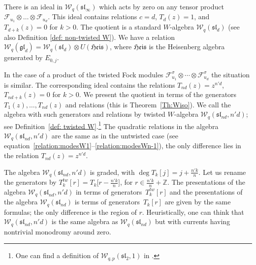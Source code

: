 \documentclass[pdftex]{sigma}
\numberwithin{equation}{section}
\theoremstyle{definition}
\newcommand{\UH}{\otimes U(\mathfrak{Heis})}
\begin{document}
There is an ideal in $\mathcal{W}_q(\mathfrak{sl}_{\infty})$ which acts by zero on any tensor product $\mathcal{F}_{u_1}\otimes \dots\otimes \mathcal{F}_{u_d}$. This ideal contains relations $c=d$, $T_d(z)=1$, and $T_{d+k}(z)=0$ for $k>0$. The quotient is a standard $W$-algebra $\mathcal{W}_q(\mathfrak{sl}_d)$ \cite{FF} (see also Definition \ref{def: non-twisted W}). We have a relation $\mathcal{W}_q(\mathfrak{gl}_d)=\mathcal{W}_q(\mathfrak{sl}_d) \UH$, where $\mathfrak{Heis}$ is the Heisenberg algebra generated by $E_{0,j}$.

In the case of a product of the twisted Fock modules ${\mathcal{F}^{\sigma}_{u_1} \otimes \cdots \otimes \mathcal{F}_{u_d}^{\sigma}}$ the situation is similar. The corresponding ideal contains the relations $T_{nd}(z)=z^{n'd}$, $T_{nd+k}(z)=0$ for $k>0$. We present the quotient in terms of the generators $T_1(z),\dots,T_{nd}(z)$ and relations (this is Theorem~\ref{Th:Wiso}). We call the algebra with such generators and relations by twisted $W$-algebra $\mathcal{W}_q(\mathfrak{sl}_{nd},n'd)$; see Definition~\ref{def: twisted W}.\footnote{One can find a definition of $\mathcal{W}_{q,p}(\mathfrak{sl}_2, 1)$ in \cite[equations~(37)--(38)]{Sh}.} The quadratic relations in the algebra $\mathcal{W}_q(\mathfrak{sl}_{nd},n'd)$ are the same as in the untwisted case (see equation~\eqref{relation:modesW1}--\eqref{relation:modesWn-1}), the only difference lies in the relation $T_{nd}(z)=z^{n'd}$.

The algebra $\mathcal{W}_q(\mathfrak{sl}_{nd},n'd)$ is graded, with $\deg T_k[j]=j+\frac{n'k}{n}$. Let us rename the generators by $T^{tw}_k[r]=T_k\big[r-\frac{n'k}{n}\big]$, for $r \in \frac{n'k}{n}+\mathbb{Z}$. The presentations of the algebra $\mathcal{W}_q(\mathfrak{sl}_{nd},n'd)$ in terms of generators~$T^{tw}_k[r]$ and the presentations of the algebra $\mathcal{W}_q(\mathfrak{sl}_{nd})$ is terms of generators~$T_k[r]$ are given by the same formulas; the only difference is the region of $r$. Heuristically, one can think that $\mathcal{W}_q(\mathfrak{sl}_{nd},n'd)$ is the same algebra as $\mathcal{W}_q(\mathfrak{sl}_{nd})$ but with currents having nontrivial monodromy around zero.
\end{document}
